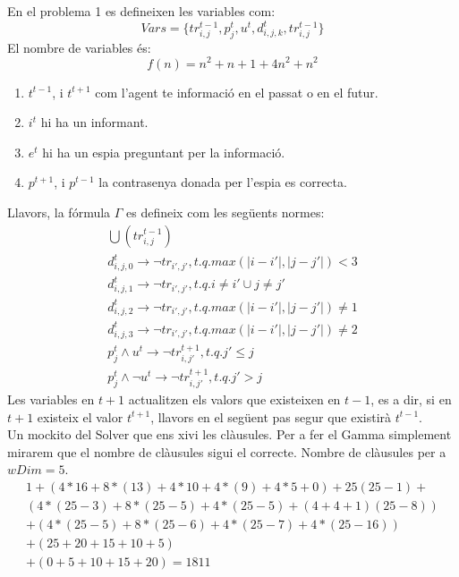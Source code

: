 
En el problema 1 es defineixen les variables com:
\[
Vars = \{tr_{i, j}^{t-1}, p_j^t, u^t, d_{i, j, k}^t, tr_{i, j}^{t-1}\}
\]
El nombre de variables és:
\[
f(n) = n^2 + n + 1 + 4n^2 + n^2
\]
\begin{enumerate}
	\item $t^{t-1}$, i $t^{t+1}$ com l'agent te informació en el passat o en el futur.
	\item $i^t$ hi ha un informant.
	\item $e^t$ hi ha un espia preguntant per la informació.
	\item $p^{t+1}$, i $p^{t-1}$ la contrasenya donada per l'espia es correcta.
\end{enumerate}
Llavors, la fórmula $\Gamma$ es defineix com les següents normes:
\begin{gather}
\bigcup(tr_{i, j}^{t-1})\\
d_{i, j, 0}^t \rightarrow \neg tr_{i', j'}, t.q. max(|i - i'|, |j - j'|) < 3\\
d_{i, j, 1}^t \rightarrow \neg tr_{i', j'}, t.q. i \neq i' \cup j \neq j'\\
d_{i, j, 2}^t \rightarrow \neg tr_{i', j'}, t.q. max(|i - i'|, |j - j'|) \neq 1\\
d_{i, j, 3}^t \rightarrow \neg tr_{i', j'}, t.q. max(|i - i'|, |j - j'|) \neq 2\\
p_j^t \wedge u^t \rightarrow \neg tr_{i, j'}^{t+1}, t.q. j' \leq j\\
p_j^t \wedge \neg u^t \rightarrow \neg tr_{i, j'}^{t+1}, t.q. j' > j
\end{gather}
Les variables en $t + 1$ actualitzen els valors que existeixen en $t-1$, es a dir, si 
en $t+1$ existeix el valor $t^{t+1}$, llavors en el següent pas segur que existirà $t^{t-1}$.\\

Un mockito del Solver que ens xivi les clàusules.
Per a fer el Gamma simplement mirarem que el nombre de clàusules sigui
el correcte. Nombre de clàusules per a $wDim = 5$.
\begin{gather}
	1 + (4*16 + 8*(13) +4*10 + 4*(9) + 4*5 + 0) + 25(25 - 1) +\\
	(4 * (25 - 3) + 8*(25-5) + 4*(25-5)+ (4+4+1)(25-8))\\
	+ (4 * (25 - 5) + 8*(25 - 6) + 4*(25 -7) + 4*(25 - 16))\\
	+ (25 + 20 + 15 + 10 + 5)\\
		+ (0 + 5 + 10 + 15 + 20)
	= 1811
\end{gather}
